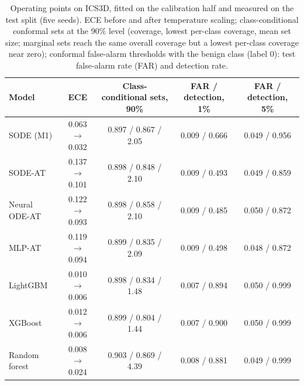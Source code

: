\documentclass{article}
\theoremstyle{definition}
\begin{document}
\begin{table}[h]
\caption{Operating points on ICS3D, fitted on the calibration half and measured on
the test split (five seeds). ECE before and after temperature scaling;
class-conditional conformal sets at the 90\% level (coverage, lowest per-class
coverage, mean set size; marginal sets reach the same overall coverage but a
lowest per-class coverage near zero); conformal false-alarm thresholds with the
benign class (label 0): test false-alarm rate (FAR) and detection rate.}
\label{tab:alarms}
\centering\footnotesize
\setlength{\tabcolsep}{3.5pt}
\begin{tabular}{lcccc}
\toprule
Model & ECE & Class-conditional sets, 90\% & FAR / detection, 1\% & FAR / detection, 5\%\\
\midrule
SODE (M1) & 0.063 $\to$ 0.032 & 0.897 / 0.867 / 2.05 & 0.009 / 0.666 & 0.049 / 0.956\\
SODE-AT & 0.137 $\to$ 0.101 & 0.898 / 0.848 / 2.10 & 0.009 / 0.493 & 0.049 / 0.859\\
Neural ODE-AT & 0.122 $\to$ 0.093 & 0.898 / 0.858 / 2.10 & 0.009 / 0.485 & 0.050 / 0.872\\
MLP-AT & 0.119 $\to$ 0.094 & 0.899 / 0.835 / 2.09 & 0.009 / 0.498 & 0.048 / 0.872\\
LightGBM & 0.010 $\to$ 0.006 & 0.898 / 0.834 / 1.48 & 0.007 / 0.894 & 0.050 / 0.999\\
XGBoost & 0.012 $\to$ 0.006 & 0.899 / 0.804 / 1.44 & 0.007 / 0.900 & 0.050 / 0.999\\
Random forest & 0.008 $\to$ 0.024 & 0.903 / 0.869 / 4.39 & 0.008 / 0.881 & 0.049 / 0.999\\
\bottomrule
\end{tabular}
\end{table}


\end{document}
